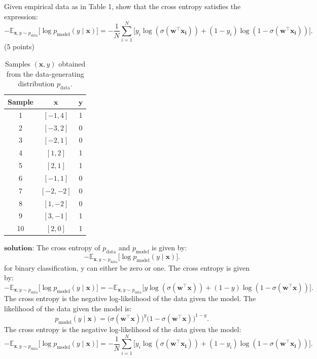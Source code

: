 \documentclass[a3paper,12pt]{article} %
\begin{document}
Given empirical data as in Table 1, show that the cross entropy satisfies the expression:
\[
-\mathbb{E}_{\mathbf{x}, y \sim p_{\text{data}}} \big[\log p_{\text{model}}(y \mid \mathbf{x})\big] = -\frac{1}{N} \sum^N_{i=1} \big[y_i \log(\sigma(\mathbf{w}^\top \mathbf{x_i})) + (1-y_i) \log(1-\sigma(\mathbf{w}^\top \mathbf{x_i}))\big].
\]
\hfill (5 points)

\begin{table}[h!]
\centering
\begin{tabular}{|c|c|c|}
\hline
\textbf{Sample} & $\mathbf{x}$ & $\mathbf{y}$ \\ \hline
1 & $[-1, 4]$ & 1 \\ \hline
2 & $[-3, 2]$ & 0 \\ \hline
3 & $[-2, 1]$ & 0 \\ \hline
4 & $[1, 2]$ & 1 \\ \hline
5 & $[2, 1]$ & 1 \\ \hline
6 & $[-1, 1]$ & 0 \\ \hline
7 & $[-2, -2]$ & 0 \\ \hline
8 & $[1, -2]$ & 0 \\ \hline
9 & $[3, -1]$ & 1 \\ \hline
10 & $[2, 0]$ & 1 \\ \hline
\end{tabular}
\caption{Samples $(\mathbf{x}, y)$ obtained from the data-generating distribution $p_{\text{data}}$.}
\label{tab:table1}
\end{table}
\(\textbf{solution:}\)
The cross entropy of $p_{\text{data}}$ and $p_{\text{model}}$ is given by:
\[
-\mathbb{E}_{\mathbf{x}, y \sim p_{\text{data}}} \big[\log p_{\text{model}}(y \mid \mathbf{x})\big].
\]
for binary classification, y can either be zero or one. The cross entropy is given by:
\[
-\mathbb{E}_{\mathbf{x}, y \sim p_{\text{data}}} \big[\log p_{\text{model}}(y \mid \mathbf{x})\big] = -\mathbb{E}_{\mathbf{x}, y \sim p_{\text{data}}} \big[y \log(\sigma(\mathbf{w}^\top \mathbf{x})) + (1-y) \log(1-\sigma(\mathbf{w}^\top \mathbf{x}))\big].
\]
The cross entropy is the negative log-likelihood of the data given the model. The likelihood of the data given the model is:
\[
p_{\text{model}}(y \mid \mathbf{x}) = \big(\sigma(\mathbf{w}^\top \mathbf{x})\big)^y \big(1 - \sigma(\mathbf{w}^\top \mathbf{x})\big)^{1-y}.
\]
The cross entropy is the negative log-likelihood of the data given the model:
\[
-\mathbb{E}_{\mathbf{x}, y \sim p_{\text{data}}} \big[\log p_{\text{model}}(y \mid \mathbf{x})\big] = -\frac{1}{N} \sum^N_{i=1} \big[y_i \log(\sigma(\mathbf{w}^\top \mathbf{x_i})) + (1-y_i) \log(1-\sigma(\mathbf{w}^\top \mathbf{x_i}))\big].
\]
\end{document}
